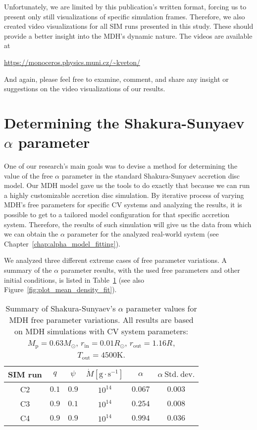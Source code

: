     Unfortunately, we are limited by this publication's written format, forcing us to present only still visualizations of specific simulation frames. Therefore, we also created video visualizations for all SIM runs presented in this study. These should provide a better insight into the MDH's dynamic nature. The videos are available at

    \begin{center}
        \url{https://monoceros.physics.muni.cz/\~kveton/} 
    \end{center}

    And again, please feel free to examine, comment, and share any insight or suggestions on the video visualizations of our results. 

\section{Determining the Shakura-Sunyaev $\alpha$ parameter}
    One of our research's main goals was to devise a method for determining the value of the free $\alpha$ parameter in the standard Shakura-Sunyaev accretion disc model. Our MDH model gave us the tools to do exactly that because we can run a highly customizable accretion disc simulation. By iterative process of varying MDH's free parameters for specific CV systems and analyzing the results, it is possible to get to a tailored model configuration for that specific accretion system. Therefore, the results of such simulation will give us the data from which we can obtain the $\alpha$ parameter for the analyzed real-world system (see Chapter~\ref{chap:alpha_model_fitting}).

    We analyzed three different extreme cases of free parameter variations. A summary of the $\alpha$ parameter results, with the used free parameters and other initial conditions, is listed in Table~\ref{tab:table_alpha_summary} (see also Figure~\ref{fig:plot_mean_density_fit}).
    
    \begin{table}[ht]
    \centering
    \begin{tabular*}{\columnwidth}{@{\extracolsep{\fill}}cccccc}
        SIM run & $q$ & $\psi$ & $\dot{M} [\si{\gram \cdot \second^{-1}}]$ & $\alpha$ & $\alpha\ \mathrm{Std.\ dev.}$ \\ 
    \hline\hline
        C2 & $0.1$ & $0.9$ & $10^{14}$ & $0.067$ & $0.003$ \\
        C3 & $0.9$ & $0.1$ & $10^{14}$ & $0.254$ & $0.008$ \\
        C4 & $0.9$ & $0.9$ & $10^{14}$ & $0.994$ & $0.036$ \\
    \hline
    \end{tabular*}
        \caption{Summary of Shakura-Sunyaev's $\alpha$ parameter values for MDH free parameter variations. All results are based on MDH simulations with CV system parameters: $M_{\mathrm{p}} = 0.63 M_{\odot}$, $r_{\mathrm{in}} = 0.01 R_{\odot}$, $r_{\mathrm{out}} = 1.16 R_{}$, $T_{\mathrm{out}} = 4500 \si{\kelvin}$.}
    \label{tab:table_alpha_summary}
    \end{table}

